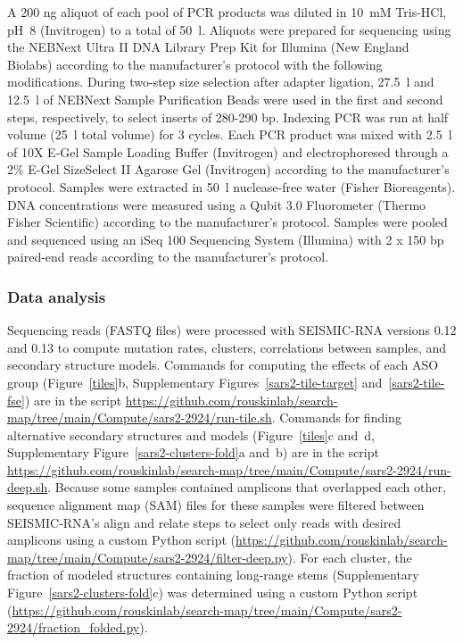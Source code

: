 \documentclass[main.tex]{subfiles}
\begin{document}
A 200 ng aliquot of each pool of PCR products was diluted in 10~mM Tris-HCl, pH~8 (Invitrogen) to a total of 50~\textmu l.
Aliquots were prepared for sequencing using the NEBNext Ultra II DNA Library Prep Kit for Illumina (New England Biolabs) according to the manufacturer's protocol with the following modifications.
During two-step size selection after adapter ligation, 27.5~\textmu l and 12.5~\textmu l of NEBNext Sample Purification Beads were used in the first and second steps, respectively, to select inserts of 280-290 bp.
Indexing PCR was run at half volume (25~\textmu l total volume) for 3 cycles.
Each PCR product was mixed with 2.5~\textmu l of 10X E-Gel Sample Loading Buffer (Invitrogen) and electrophoresed through a 2\% E-Gel SizeSelect II Agarose Gel (Invitrogen) according to the manufacturer's protocol.
Samples were extracted in 50~\textmu l nuclease-free water (Fisher Bioreagents).
DNA concentrations were measured using a Qubit 3.0 Fluorometer (Thermo Fisher Scientific) according to the manufacturer's protocol.
Samples were pooled and sequenced using an iSeq 100 Sequencing System (Illumina) with 2 x 150 bp paired-end reads according to the manufacturer's protocol.

\subsubsection{Data analysis}

Sequencing reads (FASTQ files) were processed with SEISMIC-RNA versions 0.12 and 0.13 to compute mutation rates, clusters, correlations between samples, and secondary structure models.
Commands for computing the effects of each ASO group (Figure~\ref{tiles}b, Supplementary Figures~\ref{sars2-tile-target} and~\ref{sars2-tile-fse}) are in the script \url{https://github.com/rouskinlab/search-map/tree/main/Compute/sars2-2924/run-tile.sh}.
Commands for finding alternative secondary structures and models (Figure~\ref{tiles}c and~d, Supplementary Figure~\ref{sars2-clusters-fold}a and~b) are in the script \url{https://github.com/rouskinlab/search-map/tree/main/Compute/sars2-2924/run-deep.sh}.
Because some samples contained amplicons that overlapped each other, sequence alignment map (SAM) files for these samples were filtered between SEISMIC-RNA's align and relate steps to select only reads with desired amplicons using a custom Python script (\url{https://github.com/rouskinlab/search-map/tree/main/Compute/sars2-2924/filter-deep.py}).
For each cluster, the fraction of modeled structures containing long-range stems (Supplementary Figure~\ref{sars2-clusters-fold}c) was determined using a custom Python script (\url{https://github.com/rouskinlab/search-map/tree/main/Compute/sars2-2924/fraction_folded.py}).
\end{document}
